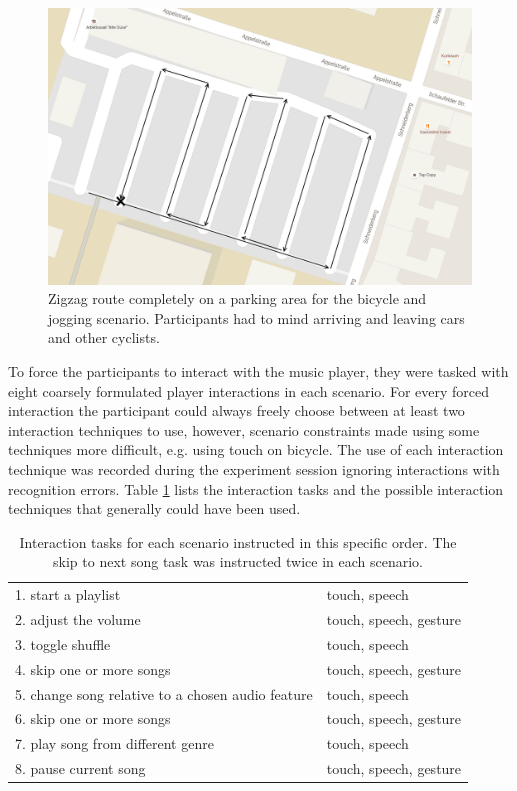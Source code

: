 \begin{figure}[bth]
	\myfloatalign
	\label{fig:parkingRoute}
	\includegraphics[width=.8\linewidth]{img/parkplatzRoute.png}
	\caption{Zigzag route completely on a parking area for the bicycle and jogging scenario. Participants had to mind arriving and leaving cars and other cyclists.}
\end{figure}

To force the participants to interact with the music player, they were tasked with eight coarsely formulated player interactions in each scenario. For every forced interaction the participant could always freely choose between at least two interaction techniques to use, however, scenario constraints made using some techniques more difficult, e.g. using touch on bicycle. The use of each interaction technique was recorded during the experiment session ignoring interactions with recognition errors. Table \ref{tab:scenarioTasks} lists the interaction tasks and the possible interaction techniques that generally could have been used.

\begin{table}[h]
	\myfloatalign
	\begin{tabularx}{\textwidth}{XX} \toprule
		\tableheadline{Forced Interaction} & \tableheadline{Possible techniques} \\ 
		\midrule
		1. start a playlist & touch, speech \\
		2. adjust the volume & touch, speech, gesture \\
		3. toggle shuffle & touch, speech \\
		4. skip one or more songs & touch, speech, gesture \\
		5. change song relative to a chosen audio feature & touch, speech \\
		6. skip one or more songs & touch, speech, gesture \\
		7. play song from different genre & touch, speech \\
		8. pause current song & touch, speech, gesture \\
		\bottomrule
	\end{tabularx}
	\caption{Interaction tasks for each scenario instructed in this specific order. The skip to next song task was instructed twice in each scenario.}
	\label{tab:scenarioTasks}
\end{table}


